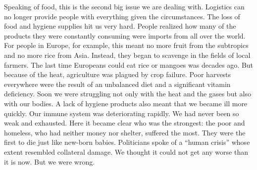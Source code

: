 \documentclass[]{book}
\begin{document}
Speaking of food, this is the second big issue we are dealing with. Logistics can no longer provide people with everything given the circumstances. The loss of food and hygiene supplies hit us very hard. People realized how many of the products they were constantly consuming were imports from all over the world. For people in Europe, for example, this meant no more fruit from the subtropics and no more rice from Asia. Instead, they began to scavenge in the fields of local farmers. The last time Europeans could eat rice or mangoes was decades ago. But because of the heat, agriculture was plagued by crop failure. Poor harvests everywhere were the result of an unbalanced diet and a significant vitamin deficiency. Soon we were struggling not only with the heat and the gases but also with our bodies. A lack of hygiene products also meant that we became ill more quickly. Our immune system was deteriorating rapidly. We had never been so weak and exhausted. Here it became clear who was the strongest: the poor and homeless, who had neither money nor shelter, suffered the most. They were the first to die just like new-born babies. Politicians spoke of a ``human crisis'' whose extent resembled collateral damage. We thought it could not get any worse than it is now. But we were wrong.
\end{document}
